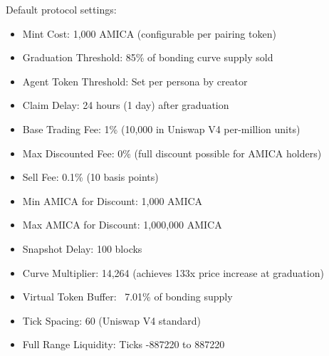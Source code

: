 \documentclass{article}
\begin{document}
\begin{appendices}
Default protocol settings:

\begin{itemize}
    \item Mint Cost: 1,000 AMICA (configurable per pairing token)
    \item Graduation Threshold: 85\% of bonding curve supply sold
    \item Agent Token Threshold: Set per persona by creator
    \item Claim Delay: 24 hours (1 day) after graduation
    \item Base Trading Fee: 1\% (10,000 in Uniswap V4 per-million units)
    \item Max Discounted Fee: 0\% (full discount possible for AMICA holders)
    \item Sell Fee: 0.1\% (10 basis points)
    \item Min AMICA for Discount: 1,000 AMICA
    \item Max AMICA for Discount: 1,000,000 AMICA
    \item Snapshot Delay: 100 blocks
    \item Curve Multiplier: 14,264 (achieves 133x price increase at graduation)
    \item Virtual Token Buffer: ~7.01\% of bonding supply
    \item Tick Spacing: 60 (Uniswap V4 standard)
    \item Full Range Liquidity: Ticks -887220 to 887220
\end{itemize}

\end{appendices}

\printbibliography
\end{document}
